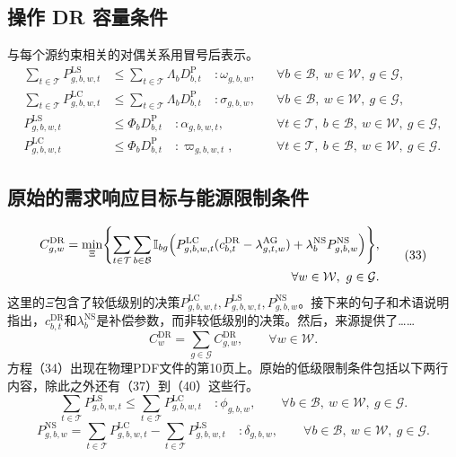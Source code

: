 \documentclass{article}
\begin{document}
\subsection*{操作 DR 容量条件}
与每个源约束相关的对偶关系用冒号后表示。
\begin{align}
\sum_{t\in\mathcal T}P^{\mathrm{LS}}_{g,b,w,t}
&\leq\sum_{t\in\mathcal T}\Lambda_bD^{\mathrm P}_{b,t}
\quad:\omega_{g,b,w},
&&\forall b\in\mathcal B,\ w\in\mathcal W,\ g\in\mathcal G,\tag{37}\\
\sum_{t\in\mathcal T}P^{\mathrm{LC}}_{g,b,w,t}
&\leq\sum_{t\in\mathcal T}\Lambda_bD^{\mathrm P}_{b,t}
\quad:\sigma_{g,b,w},
&&\forall b\in\mathcal B,\ w\in\mathcal W,\ g\in\mathcal G,\tag{38}\\
P^{\mathrm{LS}}_{g,b,w,t}&\leq\Phi_bD^{\mathrm P}_{b,t}
\quad:\alpha_{g,b,w,t},
&&\forall t\in\mathcal T,\ b\in\mathcal B,\ w\in\mathcal W,\ g\in\mathcal G,\tag{39}\\
P^{\mathrm{LC}}_{g,b,w,t}&\leq\Phi_bD^{\mathrm P}_{b,t}
\quad:\varpi_{g,b,w,t},
&&\forall t\in\mathcal T,\ b\in\mathcal B,\ w\in\mathcal W,\ g\in\mathcal G.\tag{40}
\end{align}


\subsection*{原始的需求响应目标与能源限制条件}
\begin{equation}
\begin{aligned}
C^{\mathrm{DR}}_{g,w}=\min_{\Xi}\Biggl\{
\sum_{t\in\mathcal T}\sum_{b\in\mathcal B}\mathbb I_{bg}
\Bigl(P^{\mathrm{LC}}_{g,b,w,t}(c^{\mathrm{DR}}_{b,t}-\lambda^{\mathrm{AG}}_{g,t,w})
+\lambda_b^{\mathrm{NS}}P^{\mathrm{NS}}_{g,b,w}\Bigr)\Biggr\},\\
\forall w\in\mathcal W,\ g\in\mathcal G.
\end{aligned}\tag{33}
\end{equation}
这里的\(\Xi\)包含了较低级别的决策\(P^{\mathrm{LC}}_{g,b,w,t},P^{\mathrm{LS}}_{g,b,w,t},P^{\mathrm{NS}}_{g,b,w}\)。接下来的句子和术语说明指出，\(c^{\mathrm{DR}}_{b,t}\)和\(\lambda_b^{\mathrm{NS}}\)是补偿参数，而非较低级别的决策。然后，来源提供了……
\begin{equation}
C^{\mathrm{DR}}_w=\sum_{g\in\mathcal G}C^{\mathrm{DR}}_{g,w},
\qquad\forall w\in\mathcal W.
\tag{34}
\end{equation}
方程（34）出现在物理PDF文件的第10页上。原始的低级限制条件包括以下两行内容，除此之外还有（37）到（40）这些行。
\begin{equation}
\sum_{t\in\mathcal T}P^{\mathrm{LS}}_{g,b,w,t}
\leq\sum_{t\in\mathcal T}P^{\mathrm{LC}}_{g,b,w,t}
\quad:\phi_{g,b,w},
\qquad\forall b\in\mathcal B,\ w\in\mathcal W,\ g\in\mathcal G.
\tag{35}
\end{equation}
\begin{equation}
P^{\mathrm{NS}}_{g,b,w}
=\sum_{t\in\mathcal T}P^{\mathrm{LC}}_{g,b,w,t}
-\sum_{t\in\mathcal T}P^{\mathrm{LS}}_{g,b,w,t}
\quad:\delta_{g,b,w},
\qquad\forall b\in\mathcal B,\ w\in\mathcal W,\ g\in\mathcal G.
\tag{36}
\end{equation}
\end{document}
